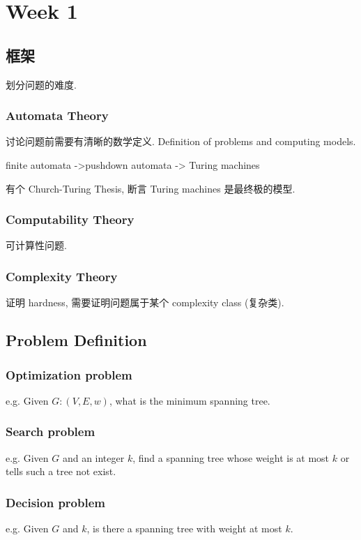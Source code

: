 \newpage
\section{Week 1}

\subsection{框架}
划分问题的难度. 
\subsubsection{Automata Theory}
讨论问题前需要有清晰的数学定义. Definition of problems and computing models. 

finite automata ->pushdown automata -> Turing machines 

有个 Church-Turing Thesis, 断言 Turing machines 是最终极的模型. 

\subsubsection{Computability Theory}
可计算性问题. 

\subsubsection{Complexity Theory}
证明 hardness, 需要证明问题属于某个 complexity class (复杂类). 


\subsection{Problem Definition}

\subsubsection{Optimization problem}
e.g. Given $G:(V,E,w)$, what is the minimum spanning tree. 

\subsubsection{Search problem}
e.g. Given $G$ and an integer $k$, find a spanning tree whose weight is at most $k$ or tells such a tree not exist. 

\subsubsection{Decision problem}
e.g. Given $G$ and $k$, is there a spanning tree with weight at most $k$. 

